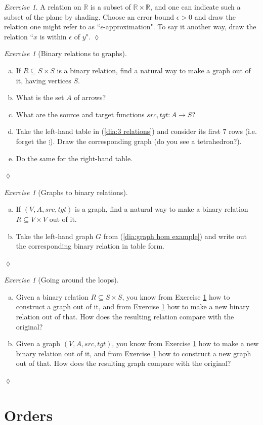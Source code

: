 \documentclass{book}
\def\RR{{\mathbb R}}
\def\to{\rightarrow}
\def\taking{\colon}
\def\ss{\subseteq}
\theoremstyle{remark}
\newtheorem{exc}[subsubsection]{Exercise}
\newenvironment{exercise}{\begin{exc}}{\hspace*{\fill}$\lozenge$\end{exc}}
\theoremstyle{definition}
\def\sexc{\begin{enumerate}[a.)]\setlength{\itemsep}{.1cm}\setlength{\parskip}{.1cm}\item}
\def\next{\item}
\def\endsexc{\end{enumerate}}
\begin{document}
\begin{exercise}
A relation on $\RR$ is a subset of $\RR\times\RR$, and one can indicate such a subset of the plane by shading. Choose an error bound $\epsilon>0$ and draw the relation one might refer to as ``$\epsilon$-approximation". To say it another way, draw the relation ``$x$ is within $\epsilon$ of $y$".
\end{exercise}

\begin{exercise}[Binary relations to graphs]\label{exc:rel to graph}

\sexc If $R\ss S\times S$ is a binary relation, find a natural way to make a graph out of it, having vertices $S$. 
\next What is the set $A$ of arrows? 
\next What are the source and target functions $src,tgt\taking A\to S$?
\next Take the left-hand table in (\ref{dia:3 relations}) and consider its first $7$ rows (i.e. forget the $\vdots$). Draw the corresponding graph (do you see a tetrahedron?). 
\next Do the same for the right-hand table.
\endsexc
\end{exercise}

\begin{exercise}[Graphs to binary relations]\label{ex:graph to rel}~
\sexc If $(V,A,src,tgt)$ is a graph, find a natural way to make a binary relation $R\ss V\times V$ out of it. 
\next Take the left-hand graph $G$ from (\ref{dia:graph hom example}) and write out the corresponding binary relation in table form.
\endsexc
\end{exercise}

\begin{exercise}[Going around the loops]
\sexc Given a binary relation $R\ss S\times S$, you know from Exercise \ref{exc:rel to graph} how to construct a graph out of it, and from Exercise \ref{ex:graph to rel} how to make a new binary relation out of that. How does the resulting relation compare with the original?
\next Given a graph $(V,A,src,tgt)$, you know from Exercise \ref{ex:graph to rel} how to make a new binary relation out of it, and from Exercise \ref{exc:rel to graph} how to construct a new graph out of that. How does the resulting graph compare with the original? 
\endsexc
\end{exercise}


\section{Orders}\label{sec:orders}
\end{document}
